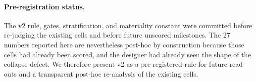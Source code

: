 \paragraph{Pre-registration status.}
The v2 rule, gates, stratification, and materiality constant were committed before re-judging the existing cells and before future unscored milestones. The 27 numbers reported here are nevertheless post-hoc by construction because those cells had already been scored, and the designer had already seen the shape of the collapse defect. We therefore present v2 as a pre-registered rule for future read-outs and a transparent post-hoc re-analysis of the existing cells.
